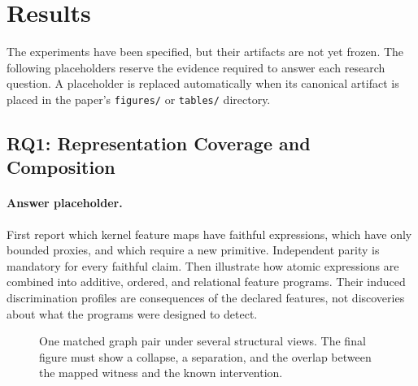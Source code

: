 \section{Results}
\label{sec:results}

The experiments have been specified, but their artifacts are not yet frozen.
The following placeholders reserve the evidence required to answer each
research question. A placeholder is replaced automatically when its canonical
artifact is placed in the paper's \texttt{figures/} or \texttt{tables/}
directory.

\subsection{RQ1: Representation Coverage and Composition}

\paragraph{Answer placeholder.}
First report which kernel feature maps have faithful expressions, which have
only bounded proxies, and which require a new primitive. Independent parity is
mandatory for every faithful claim. Then illustrate how atomic expressions are
combined into additive, ordered, and relational feature programs. Their induced
discrimination profiles are consequences of the declared features, not
discoveries about what the programs were designed to detect.

\begin{figure}[t]
  \centering
  \caption{One matched graph pair under several structural views. The final
  figure must show a collapse, a separation, and the overlap between the mapped
  witness and the known intervention.}
  \label{fig:structural-views}
\end{figure}

